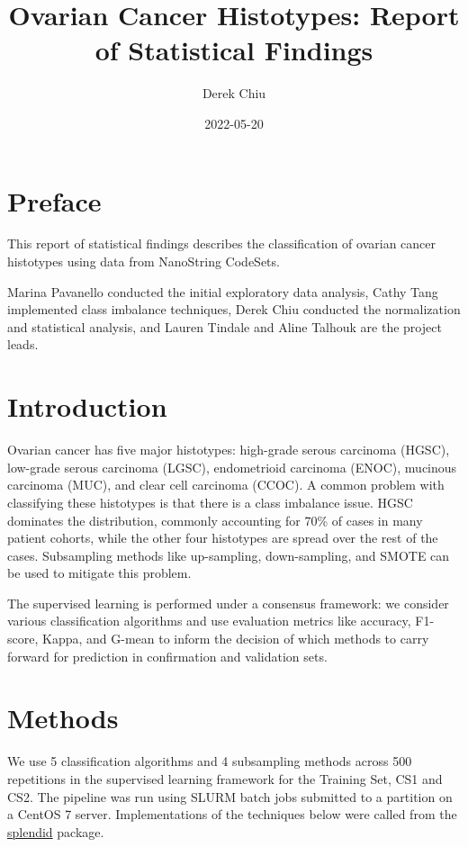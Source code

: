\documentclass[
]{report}
\title{Ovarian Cancer Histotypes: Report of Statistical Findings}
\author{Derek Chiu}
\date{2022-05-20}
\begin{document}
\maketitle

{
\hypersetup{linkcolor=}
\setcounter{tocdepth}{1}
\tableofcontents
}
\listoffigures
\listoftables
\hypertarget{preface}{%
\chapter*{Preface}\label{preface}}

This report of statistical findings describes the classification of ovarian cancer histotypes using data from NanoString CodeSets.

Marina Pavanello conducted the initial exploratory data analysis, Cathy Tang implemented class imbalance techniques, Derek Chiu conducted the normalization and statistical analysis, and Lauren Tindale and Aline Talhouk are the project leads.

\hypertarget{introduction}{%
\chapter{Introduction}\label{introduction}}

Ovarian cancer has five major histotypes: high-grade serous carcinoma (HGSC), low-grade serous carcinoma (LGSC), endometrioid carcinoma (ENOC), mucinous carcinoma (MUC), and clear cell carcinoma (CCOC). A common problem with classifying these histotypes is that there is a class imbalance issue. HGSC dominates the distribution, commonly accounting for 70\% of cases in many patient cohorts, while the other four histotypes are spread over the rest of the cases. Subsampling methods like up-sampling, down-sampling, and SMOTE can be used to mitigate this problem.

The supervised learning is performed under a consensus framework: we consider various classification algorithms and use evaluation metrics like accuracy, F1-score, Kappa, and G-mean to inform the decision of which methods to carry forward for prediction in confirmation and validation sets.

\hypertarget{methods}{%
\chapter{Methods}\label{methods}}

We use 5 classification algorithms and 4 subsampling methods across 500 repetitions in the supervised learning framework for the Training Set, CS1 and CS2. The pipeline was run using SLURM batch jobs submitted to a partition on a CentOS 7 server. Implementations of the techniques below were called from the \href{https://alinetalhouk.github.io/splendid/}{splendid} package.
\end{document}
